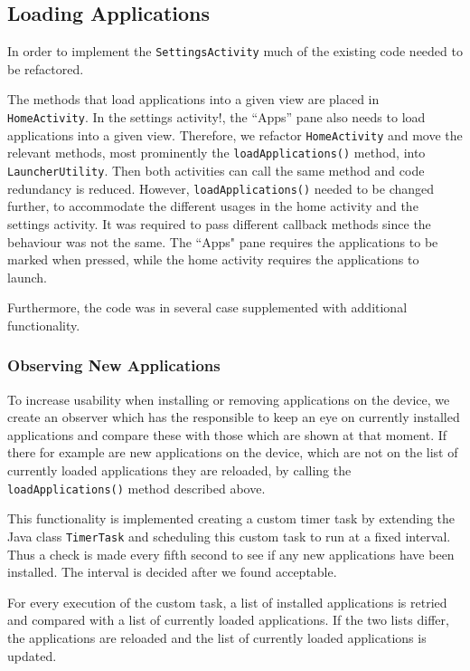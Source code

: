 \subsection{Loading Applications}\label{sect:sprint3:refactoring}
In order to implement the \lstinline!SettingsActivity! much of the existing code needed to be refactored.

The methods that load applications into a given view are placed in \lstinline!HomeActivity!.
In the settings activity!, the ``Apps'' pane also needs to load applications into a given view.
Therefore, we refactor \lstinline!HomeActivity! and move the relevant methods, most prominently the \lstinline|loadApplications()| method, into \lstinline!LauncherUtility!.
Then both activities can call the same method and code redundancy is reduced. 
However, \lstinline|loadApplications()| needed to be changed further, to accommodate the different usages in the home activity and the settings activity. It was required to pass different callback methods since the behaviour was not the same. The ``Apps" pane requires the applications to be marked when pressed, while the home activity requires the applications to launch.

Furthermore, the code was in several case supplemented with additional functionality.

\subsubsection{Observing New Applications}\label{sec:sprint3:observing}
To increase usability when installing or removing applications on the device, we create an observer which has the responsible to keep an eye on currently installed applications and compare these with those which are shown at that moment. 
If there for example are new applications on the device, which are not on the list of currently loaded applications they are reloaded, by calling the \lstinline|loadApplications()| method described above.

This functionality is implemented creating a custom timer task by extending the Java class \lstinline!TimerTask! and scheduling this custom task to run at a fixed interval. 
Thus a check is made every fifth second to see if any new applications have been installed.
The interval is decided after we found acceptable.

For every execution of the custom task, a list of installed applications is retried and compared with a list of currently loaded applications. 
If the two lists differ, the applications are reloaded and the list of currently loaded applications is updated.